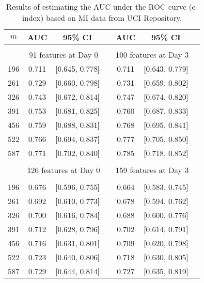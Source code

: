 \documentclass[12pt]{article}
\begin{document}
\begin{table}[ht]{
\centering
\setlength{\tabcolsep}{3pt}
\renewcommand{\arraystretch}{0.5}\begin{tabular}{ ccc c ccc }
$m$   &  AUC     &  95\% CI    && AUC & 95\% CI  \\
\hline\\
    & \multicolumn{2}{c}{91 features at Day 0} && \multicolumn{2}{c}{100 features at Day 3}\\

196 &  0.711  & [0.645, 0.778] && 0.711 & [0.643, 0.779] \\
261 &  0.729  & [0.660, 0.798] && 0.731 & [0.659, 0.802] \\
326 &  0.743  & [0.672, 0.814] && 0.747 & [0.674, 0.820] \\
391 &  0.753  & [0.681, 0.825] && 0.760 & [0.687, 0.833] \\
456 &  0.759  & [0.688, 0.831] && 0.768 & [0.695, 0.841] \\
522 &  0.766  & [0.694, 0.837] && 0.777 & [0.705, 0.850] \\
587 &  0.771  & [0.702, 0.840] && 0.785 & [0.718, 0.852] \\
\cline{2-6}\\
 & \multicolumn{2}{c}{126 features at Day 0} && \multicolumn{2}{c}{159 features at Day 3} \\
     \cline{2-3} \cline{5-6}\\
196 &  0.676  & [0.596, 0.755] && 0.664 & [0.583, 0.745] \\
261 &  0.692  & [0.610, 0.773] && 0.678 & [0.594, 0.762]\\
326 &  0.700  & [0.616, 0.784] && 0.688 & [0.600, 0.776]\\
391 &  0.712  & [0.628, 0.796] && 0.702 & [0.614, 0.791]\\
456 &  0.716  & [0.631, 0.801] && 0.709 & [0.620, 0.798]\\
522 &  0.723  & [0.640, 0.806] && 0.718 & [0.630, 0.805]\\
587 &  0.729  & [0.644, 0.814] && 0.727 & [0.635, 0.819]

\end{tabular} 
\caption{Results of estimating the AUC under the ROC curve (c-index) based on MI data from UCI Repository.}\label{tab:example2a1}}
\end{table} 
\end{document}
